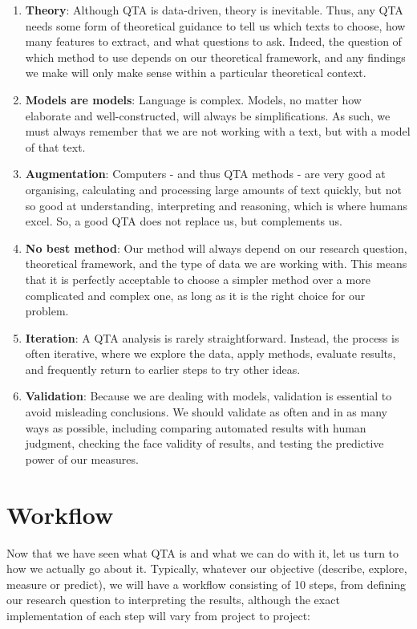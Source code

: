 \documentclass[
]{book}
\providecommand{\tightlist}{%
  \setlength{\itemsep}{0pt}\setlength{\parskip}{0pt}}
\begin{document}
\begin{enumerate}
\def\labelenumi{\arabic{enumi}.}
\tightlist
\item
  \textbf{Theory}: Although QTA is data-driven, theory is inevitable. Thus, any QTA needs some form of theoretical guidance to tell us which texts to choose, how many features to extract, and what questions to ask. Indeed, the question of which method to use depends on our theoretical framework, and any findings we make will only make sense within a particular theoretical context.
\item
  \textbf{Models are models}: Language is complex. Models, no matter how elaborate and well-constructed, will always be simplifications. As such, we must always remember that we are not working with a text, but with a model of that text.
\item
  \textbf{Augmentation}: Computers - and thus QTA methods - are very good at organising, calculating and processing large amounts of text quickly, but not so good at understanding, interpreting and reasoning, which is where humans excel. So, a good QTA does not replace us, but complements us.
\item
  \textbf{No best method}: Our method will always depend on our research question, theoretical framework, and the type of data we are working with. This means that it is perfectly acceptable to choose a simpler method over a more complicated and complex one, as long as it is the right choice for our problem.
\item
  \textbf{Iteration}: A QTA analysis is rarely straightforward. Instead, the process is often iterative, where we explore the data, apply methods, evaluate results, and frequently return to earlier steps to try other ideas.
\item
  \textbf{Validation}: Because we are dealing with models, validation is essential to avoid misleading conclusions. We should validate as often and in as many ways as possible, including comparing automated results with human judgment, checking the face validity of results, and testing the predictive power of our measures.
\end{enumerate}

\section{Workflow}\label{workflow}

Now that we have seen what QTA is and what we can do with it, let us turn to how we actually go about it. Typically, whatever our objective (describe, explore, measure or predict), we will have a workflow consisting of 10 steps, from defining our research question to interpreting the results, although the exact implementation of each step will vary from project to project:
\end{document}

